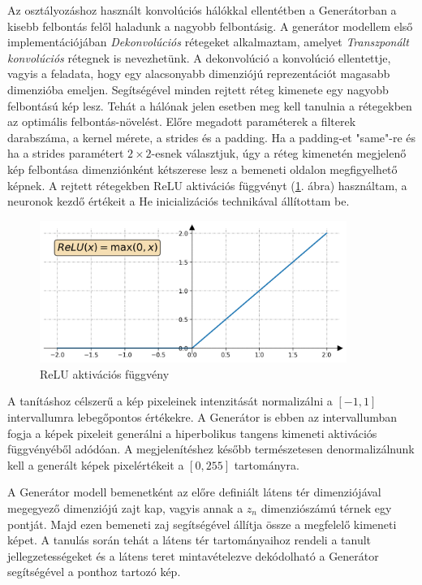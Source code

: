 
Az osztályozáshoz használt konvolúciós hálókkal ellentétben a Generátorban a kisebb felbontás felől haladunk a nagyobb felbontásig.
A generátor modellem első implementációjában \textit{Dekonvolúciós} rétegeket alkalmaztam, amelyet \textit{Transzponált konvolúciós} rétegnek is nevezhetünk. A dekonvolúció a konvolúció ellentettje, vagyis a feladata, hogy egy alacsonyabb dimenziójú reprezentációt magasabb dimenzióba emeljen. Segítségével minden rejtett réteg kimenete egy nagyobb felbontású kép lesz. Tehát a hálónak jelen esetben meg kell tanulnia a rétegekben az optimális felbontás-növelést. Előre megadott paraméterek a filterek darabszáma, a kernel mérete, a strides és a padding. Ha a padding-et "same"-re és ha a strides paramétert $2 \times 2$-esnek választjuk, úgy a réteg kimenetén megjelenő kép felbontása dimenziónként kétszerese lesz a bemeneti oldalon megfigyelhető képnek. A rejtett rétegekben ReLU aktivációs függvényt (\ref{fig:relu}. ábra) használtam, a neuronok kezdő értékeit a He inicializációs technikával \cite{he2015delving} állítottam be.

\begin{figure}[h]
\centering
\includegraphics[width=10cm]{images/relu.png}
\caption{ReLU aktivációs függvény}
\label{fig:relu}
\end{figure}

A tanításhoz célszerű a kép pixeleinek intenzitását normalizálni a $[-1, 1]$ intervallumra lebegőpontos értékekre. A Generátor is ebben az intervallumban fogja a képek pixeleit generálni a hiperbolikus tangens kimeneti aktivációs függvényéből adódóan. A megjelenítéshez később természetesen denormalizálnunk kell a generált képek pixelértékeit a $[0, 255]$ tartományra.

A Generátor modell bemenetként az előre definiált látens tér dimenziójával megegyező dimenziójú zajt kap, vagyis annak a $z_n$ dimenziószámú térnek egy pontját. Majd ezen bemeneti zaj segítségével állítja össze a megfelelő kimeneti képet. A tanulás során tehát a látens tér tartományaihoz rendeli a tanult jellegzetességeket és a látens teret mintavételezve dekódolható a Generátor segítségével a ponthoz tartozó kép.

